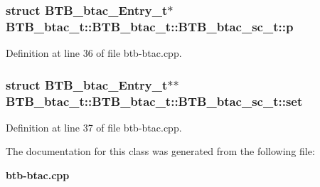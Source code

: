 \subsubsection[{p}]{\setlength{\rightskip}{0pt plus 5cm}struct {\bf BTB\_\-btac\_\-Entry\_\-t}$\ast$ BTB\_\-btac\_\-t::BTB\_\-btac\_\-t::BTB\_\-btac\_\-sc\_\-t::p\hspace{0.3cm}{\tt  [read]}}\label{classBTB__btac__t_1_1BTB__btac__sc__t_ec46cad27d987ff1943e44a96ea3b364}




Definition at line 36 of file btb-btac.cpp.
\subsubsection[{set}]{\setlength{\rightskip}{0pt plus 5cm}struct {\bf BTB\_\-btac\_\-Entry\_\-t}$\ast$$\ast$ BTB\_\-btac\_\-t::BTB\_\-btac\_\-t::BTB\_\-btac\_\-sc\_\-t::set\hspace{0.3cm}{\tt  [read]}}\label{classBTB__btac__t_1_1BTB__btac__sc__t_19bb88c6035551e0ecb0e0a0e20e76a8}




Definition at line 37 of file btb-btac.cpp.

The documentation for this class was generated from the following file:\begin{CompactItemize}
\item 
{\bf btb-btac.cpp}\end{CompactItemize}
